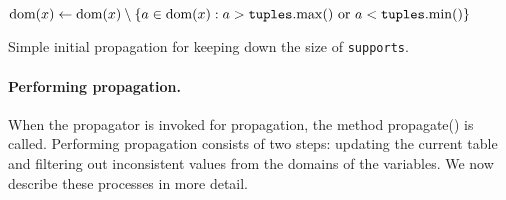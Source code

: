 \documentclass[a4paper,11pt]{article}
\newcommand{\Dom}[1]{\text{dom}({#1})}
\newcommand{\Scp}{\texttt{scp}}
\newcommand{\Supports}{\texttt{supports}}
\newcommand{\FOREACH}[1]{\WHILE{{#1} \textbf{do}}}
\newcommand{\ENDFOREACH}{\ENDWHILE}
\newcommand{\function}[1]{\mathrm{#1}}
\begin{document}
\begin{algorithm}[h]
  \begin{algorithmic}[1]  %
    \FOREACH{$x \in \Scp$} %
        \STATE $\Dom{x} \leftarrow \Dom{x} \setminus  
        \Set{a \in \Dom{x} : a > \texttt{tuples}.\function{max}()
          ~\text{or}~a < \texttt{tuples}.\function{min}()}$
      \ENDFOREACH
  \end{algorithmic}
  \caption{Simple initial propagation for keeping down the size of \Supports.}
  \label{algo:initial-propagation}
\end{algorithm}

\paragraph{Performing propagation.}
When the propagator is invoked for propagation, the method propagate() is called.
Performing propagation consists of two steps: updating the current
table and filtering out inconsistent values from the domains of the variables.
We now describe these processes in more detail.
\end{document}

